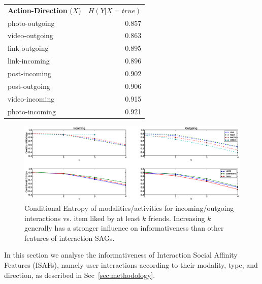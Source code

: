 \begin{table}
{\begin{tabular}{| >{\small}l | >{\small}r | }
		\hline
\multicolumn{2}{c}{}\\
                \hline	
		\textbf{Action-Direction} ($X$) & $H(Y|X=true)$ \\
		\hline
		photo-outgoing & 0.857 \\
		video-outgoing & 0.863 \\
		link-outgoing & 0.895 \\
		link-incoming & 0.896 \\
		post-incoming & 0.902 \\
		post-outgoing & 0.906 \\
		video-incoming & 0.915 \\
		photo-incoming & 0.921 \\
		\hline
				
	\end{tabular}}
\end{table}

\begin{figure}[tbp!]
\hspace{-15mm}\includegraphics[width=210mm]{data/plots/vsk/ModalityActionsvsKFriends.eps}
\vspace{-6mm}
\caption{Conditional Entropy  of modalities/activities for incoming/outgoing interactions vs. item liked by at least $k$ friends.  Increasing $k$ generally has a stronger influence on informativeness than other features of interaction SAGs.}
\label{Fig2}
\end{figure}

In this section we analyse the informativeness of Interaction Social
Affinity Features (ISAFs), namely user interactions according to their
modality, type, and direction, as described in
Sec~\ref{sec:methodology}.

